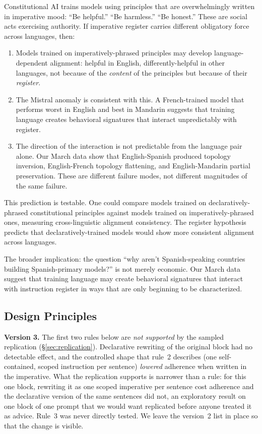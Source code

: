 \documentclass[11pt,a4paper]{article}
\begin{document}
Constitutional AI \citep{bai2022constitutional} trains models using
principles that are overwhelmingly written in imperative mood: ``Be
helpful.'' ``Be harmless.'' ``Be honest.'' These are social acts
exercising authority. If imperative register carries different
obligatory force across languages, then:

\begin{enumerate}[nosep]
\item Models trained on imperatively-phrased principles may develop
  language-dependent alignment: helpful in English,
  differently-helpful in other languages, not because of the
  \emph{content} of the principles but because of their
  \emph{register}.
\item The Mistral anomaly is consistent with this. A French-trained model that
  performs worst in English and best in Mandarin suggests that
  training language creates behavioral signatures that interact
  unpredictably with register.
\item The direction of the interaction is not predictable from the
  language pair alone. Our March data show that English-Spanish produced
  topology inversion, English-French topology
  flattening, and English-Mandarin partial preservation.
  These are different failure modes, not different magnitudes of
  the same failure.
\end{enumerate}

This prediction is testable. One could compare models trained on
declaratively-phrased constitutional principles against models trained
on imperatively-phrased ones, measuring cross-linguistic alignment
consistency. The register hypothesis predicts that
declaratively-trained models would show more consistent alignment
across languages.

The broader implication: the question ``why aren't Spanish-speaking
countries building Spanish-primary models?'' is not merely economic.
Our March data suggest that training language may create behavioral
signatures that interact with instruction register in ways that are
only beginning to be characterized.

\subsection{Design Principles}

\noindent\textbf{Version 3.} The first two rules below are \emph{not
supported} by the sampled replication (\S\ref{sec:replication}).
Declarative rewriting of the original block had no detectable effect,
and the controlled shape that rule~2 describes (one self-contained,
scoped instruction per sentence) \emph{lowered} adherence when written
in the imperative. What the replication supports is narrower than a
rule: for this one block, rewriting it as one scoped imperative per
sentence cost adherence and the declarative version of the same
sentences did not, an exploratory result on one block of one prompt
that we would want replicated before anyone treated it as advice.
Rule~3 was never directly tested. We leave the
version~2 list in place so that the change is visible.
\end{document}
